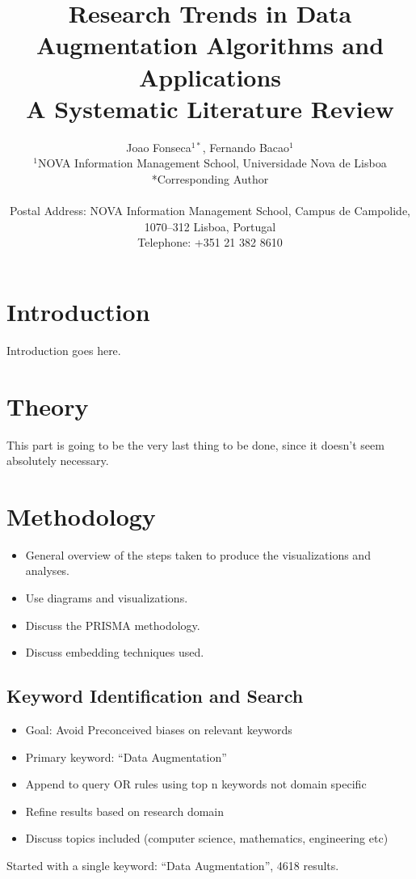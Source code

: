 \documentclass[parskip=full]{scrartcl}
\date{}
\title{%
    Research Trends in Data Augmentation Algorithms and Applications\\
    \LARGE{A Systematic Literature Review}
}
\author{%
	Joao Fonseca\(^{1*}\), Fernando Bacao\(^{1}\)
	\\
	\small{\(^{1}\)NOVA Information Management School, Universidade Nova de Lisboa}
	\\
	\small{*Corresponding Author}
	\\
	\\
	\small{Postal Address: NOVA Information Management School, Campus de
    Campolide, 1070--312 Lisboa, Portugal}
	\\
	\small{Telephone: +351 21 382 8610}
}
\begin{document}
\maketitle

\section{Introduction}

Introduction goes here.

\section{Theory}

This part is going to be the very last thing to be done, since it doesn't seem
absolutely necessary.

\section{Methodology}

\begin{itemize}
    \item General overview of the steps taken to produce the visualizations
        and analyses.
    \item Use diagrams and visualizations.
    \item Discuss the PRISMA methodology.
    \item Discuss embedding techniques used.
\end{itemize}

\subsection{Keyword Identification and Search}

\begin{itemize}
    \item Goal: Avoid Preconceived biases on relevant keywords
    \item Primary keyword: ``Data Augmentation''
    \item Append to query OR rules using top n keywords not domain specific
    \item Refine results based on research domain
    \item Discuss topics included (computer science, mathematics, engineering
        etc)
\end{itemize}

Started with a single keyword: ``Data Augmentation'', 4618 results.
\end{document}
